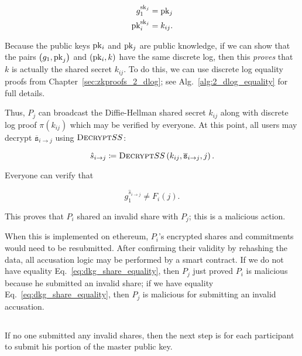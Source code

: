 \begin{align}
    g_{1}^{\textrm{sk}_{j}} &= \textrm{pk}{}_{j} \nonumber\\
    \textrm{pk}{}_{i}^{\textrm{sk}_{j}} &= k_{ij}.
\end{align}

\noindent
Because the public keys $\textrm{pk}{}_{i}$ and $\textrm{pk}{}_{j}$ are public knowledge,
if we can show that the pairs $\left( g_{1},\textrm{pk}_{j} \right)$ and
$\left( \textrm{pk}{}_{i}, k \right)$ have the same \gls{discrete log},
then this \emph{proves} that $k$ is actually the shared secret $k_{ij}$.
To do this, we can use \gls{discrete log} equality proofs
from Chapter~\ref{sec:zkproofs_2_dlog};
see Alg.~\ref{alg:2_dlog_equality} for full details.



Thus, $P_{j}$ can broadcast the Diffie-Hellman shared secret
$k_{ij}$ along with \gls{discrete log} proof $\pi(k_{ij})$
which may be verified by everyone.
At this point, all users may decrypt $\overline{\texttt{s}}_{i\to j}$
using $\textsc{Decrypt}{}SS$:

\begin{equation}
    \hat{s}_{i\to j} \coloneqq{} 
        \textsc{Decrypt}{}SS\left( k_{ij},\overline{\texttt{s}}_{i\to j}, j \right).
\end{equation}

\noindent
Everyone can verify that

\begin{equation}
    g_{1}^{\hat{s}_{i\to j}} \ne F_{i}(j).
\end{equation}

\noindent
This proves that $P_{i}$ shared an invalid share with $P_{j}$;
this is a malicious action.

When this is implemented on \gls{ethereum},
$P_{i}$'s encrypted shares and commitments would need to be resubmitted.
After confirming their validity by rehashing the data,
all accusation logic may be performed by a \gls{smart contract}.
If we do not have equality Eq.~\eqref{eq:dkg_share_equality},
then $P_{j}$ just proved $P_{i}$ is malicious
because he submitted an invalid share;
if we have equality Eq.~\eqref{eq:dkg_share_equality},
then $P_{j}$ is malicious for submitting an invalid accusation.


\subsection{\KeyShareSubmission{}}
\label{ssec:secret_dkg_key_share}

If no one submitted any invalid shares,
then the next step is for each participant to submit his portion
of the master public key.

